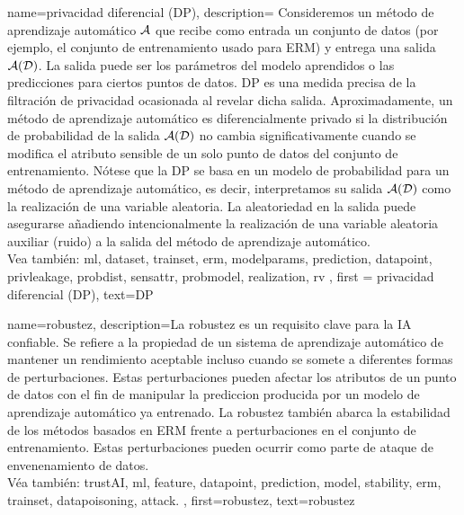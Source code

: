 		

	 {name=privacidad diferencial (DP),
	  description={
		  Consideremos un método de aprendizaje automático $\mathcal{A}$ que recibe como entrada un conjunto de datos (por ejemplo, el conjunto de entrenamiento
		  usado para ERM) y entrega una salida $\mathcal{A}(\mathcal{D})$. La salida 
		  puede ser los parámetros del modelo aprendidos o las predicciones para ciertos puntos de datos. 
		  DP es una medida precisa de la filtración de privacidad ocasionada al revelar dicha salida.
		 Aproximadamente, un método de aprendizaje automático es diferencialmente privado si la distribución de probabilidad
		  de la salida $\mathcal{A}(\mathcal{D})$ no cambia significativamente cuando se modifica el atributo sensible
		  de un solo punto de datos del conjunto de entrenamiento. Nótese que la DP 
		  se basa en un modelo de probabilidad para un método de aprendizaje automático, es decir, interpretamos su salida $\mathcal{A}(\mathcal{D})$ 
		  como la realización de una variable aleatoria. La aleatoriedad en la salida puede asegurarse añadiendo intencionalmente la
		  realización de una variable aleatoria auxiliar (ruido) a la salida del método de aprendizaje automático.
		  \\
		  Vea también: \gls{ml}, \gls{dataset}, \gls{trainset}, \gls{erm}, \glspl{modelparam}, \gls{prediction}, \gls{datapoint}, \gls{privleakage}, \gls{probdist}, \gls{sensattr}, \gls{probmodel}, \gls{realization}, \gls{rv}  }, 
		 first = {privacidad diferencial (DP)}, text={DP} 
	 }

	 {name={robustez},
		 description={La robustez es un requisito clave para la IA confiable. 
		 Se refiere a la propiedad de un sistema de aprendizaje automático de mantener un rendimiento aceptable incluso 
		 cuando se somete a diferentes formas de perturbaciones. Estas perturbaciones pueden afectar los
		 atributos de un punto de datos con el fin de manipular la prediccion producida 
		 por un modelo de aprendizaje automático ya entrenado. La robustez también abarca la estabilidad
		 de los métodos basados en ERM frente a perturbaciones en el conjunto de entrenamiento. 
		 Estas perturbaciones pueden ocurrir como parte de ataque de envenenamiento de datos.\\ 
		 Véa también: \gls{trustAI}, \gls{ml}, \gls{feature}, \gls{datapoint}, \gls{prediction}, 
		 \gls{model}, \gls{stability}, \gls{erm}, \gls{trainset}, \gls{datapoisoning}, \gls{attack}.
		 }, 
		 first={robustez}, 
		 text={robustez} 
	 }
	 
